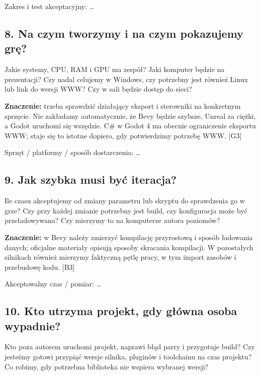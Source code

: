 \documentclass[10pt,a4paper]{article}
\begin{document}
Zakres i test akceptacyjny: …



\subsection*{8. Na czym tworzymy i na czym pokazujemy grę?}


Jakie systemy, CPU, RAM i GPU ma zespół? Jaki komputer będzie na prezentacji? Czy nadal celujemy w Windows, czy potrzebny jest również Linux lub link do wersji WWW? Czy w sali będzie dostęp do sieci?



\textbf{Znaczenie:} trzeba sprawdzić działający eksport i sterowniki na konkretnym sprzęcie. Nie zakładamy automatycznie, że Bevy będzie szybsze, Unreal za ciężki, a Godot uruchomi się wszędzie. C\# w Godot 4 ma obecnie ograniczenie eksportu WWW; staje się to istotne dopiero, gdy potwierdzimy potrzebę WWW. [G3]



Sprzęt / platformy / sposób dostarczenia: …



\subsection*{9. Jak szybka musi być iteracja?}


Ile czasu akceptujemy od zmiany parametru lub skryptu do sprawdzenia go w grze? Czy przy każdej zmianie potrzebny jest build, czy konfiguracja może być przeładowywana? Czy mierzymy to na komputerze autora poziomów?



\textbf{Znaczenie:} w Bevy należy zmierzyć kompilację przyrostową i sposób ładowania danych; oficjalne materiały opisują sposoby skracania kompilacji. W pozostałych silnikach również mierzymy faktyczną pętlę pracy, w tym import zasobów i przebudowę kodu. [B3]



Akceptowalny czas / pomiar: …



\subsection*{10. Kto utrzyma projekt, gdy główna osoba wypadnie?}


Kto poza autorem uruchomi projekt, naprawi błąd parry i przygotuje build? Czy jesteśmy gotowi przypiąć wersje silnika, pluginów i toolchainu na czas projektu? Co robimy, gdy potrzebna biblioteka nie wspiera wybranej wersji?
\end{document}
